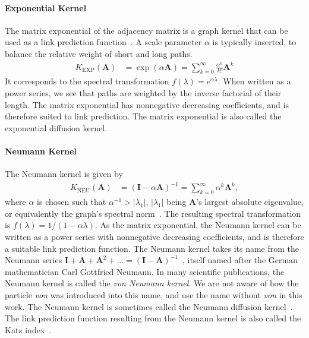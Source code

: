 \documentclass[11pt,a4paper]{book}
\begin{document}
\paragraph{Exponential Kernel}
The matrix exponential of the adjacency matrix is a graph kernel that
can be used as a link prediction function~\cite{b156}.  A scale
parameter $\alpha$ is typically inserted, to balance the relative weight
of short and long paths. 
\begin{align}
  K_{\mathrm{EXP}}(\mathbf A) &= \exp(\alpha \mathbf A) =
  \sum_{k=0}^\infty \frac {\alpha^k} {k!} \mathbf A^k 
  \label{eq:matrix-exponential}
\end{align}
It corresponds to the spectral transformation $f(\lambda)=e^{\alpha
  \lambda}$.  
When written as a power series, we see that paths are weighted by the
inverse factorial of their length. 
The matrix exponential has nonnegative decreasing coefficients, and is
therefore suited to link prediction. 
The matrix exponential is also called the exponential diffusion
kernel.  

\paragraph{Neumann Kernel}
The Neumann kernel is given by
\begin{align} 
  K_{\textrm{NEU}}(\mathbf A) &= (\mathbf I - \alpha \mathbf A)^{-1} 
  = \sum_{k=0}^\infty \alpha^k \mathbf A^k,
  \label{eq:neumann-kernel}
\end{align}
where $\alpha$ is chosen such that $\alpha^{-1} >
|\lambda_1|$, $|\lambda_1|$ being $\mathbf A$'s largest absolute eigenvalue,
or equivalently the graph's spectral norm~\cite{b263}.  The resulting
spectral transformation is 
$f(\lambda) = 1/(1 - \alpha \lambda)$. 
As the matrix exponential, the Neumann kernel can be written as a
power series with nonnegative decreasing coefficients, and is
therefore a suitable link prediction function.
The Neumann kernel takes its name from the Neumann series 
$\mathbf I + \mathbf A + \mathbf A^2 + \ldots = (\mathbf I - \mathbf 
A)^{-1}$~\cite{b664}, itself named after the German mathematician Carl
Gottfried Neumann. 
In many scientific publications, the Neumann kernel is
called the \emph{von Neumann kernel}.  
We are not aware of how the particle \emph{von} was introduced into this
name, and use the name without \emph{von} in this work.  
The Neumann kernel is sometimes called the Neumann diffusion
kernel~\cite{b152}. 
The link prediction function resulting from the Neumann kernel is
also called the Katz index~\cite{b145}. 
\end{document}
